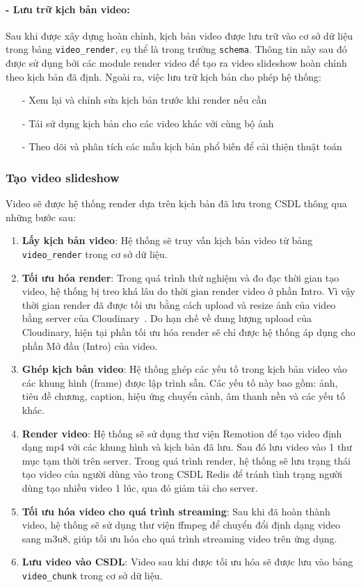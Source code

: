 \paragraph{- Lưu trữ kịch bản video:}
Sau khi được xây dựng hoàn chỉnh, kịch bản video được lưu trữ vào cơ sở dữ liệu trong bảng \texttt{video\_render}, cụ thể là trong trường \texttt{schema}. Thông tin này sau đó được sử dụng bởi các module render video để tạo ra video slideshow hoàn chỉnh theo kịch bản đã định. Ngoài ra, việc lưu trữ kịch bản cho phép hệ thống:
\begin{itemize}
    \item[-] Xem lại và chỉnh sửa kịch bản trước khi render nếu cần
    \item[-] Tái sử dụng kịch bản cho các video khác với cùng bộ ảnh
    \item[-] Theo dõi và phân tích các mẫu kịch bản phổ biến để cải thiện thuật toán
\end{itemize}

\subsubsection{Tạo video slideshow}
Video sẽ được hệ thống render dựa trên kịch bản đã lưu trong CSDL thông qua những bước sau:

\begin{enumerate}
    \item \textbf{Lấy kịch bản video}: Hệ thống sẽ truy vấn kịch bản video từ bảng \texttt{video\_render} trong cơ sở dữ liệu.
    \item \textbf{Tối ưu hóa render}: Trong quá trình thử nghiệm và đo đạc thời gian tạo video, hệ thống bị treo khá lâu do thời gian render video ở phần Intro. Vì vậy thời gian render đã được tối ưu bằng cách upload và resize ảnh của video bằng server của Cloudinary~\cite{cloudinary}. Do hạn chế về dung lượng upload của Cloudinary, hiện tại phần tối ưu hóa render sẽ chỉ được hệ thống áp dụng cho phần Mở đầu (Intro) của video.
    \item \textbf{Ghép kịch bản video}: Hệ thống ghép các yếu tố trong kịch bản video vào các khung hình (frame) được lập trình sẵn. Các yếu tố này bao gồm: ảnh, tiêu đề chương, caption, hiệu ứng chuyển cảnh, âm thanh nền và các yếu tố khác.
    \item \textbf{Render video}: Hệ thống sẽ sử dụng thư viện Remotion để tạo video định dạng mp4 với các khung hình và kịch bản đã lưu. Sau đó lưu video vào 1 thư mục tạm thời trên server. Trong quá trình render, hệ thống sẽ lưu trạng thái tạo video của người dùng vào trong CSDL Redis để tránh tình trạng người dùng tạo nhiều video 1 lúc, qua đó giảm tải cho server.
    \item \textbf{Tối ưu hóa video cho quá trình streaming}: Sau khi đã hoàn thành video, hệ thống sẽ sử dụng thư viện ffmpeg để chuyển đổi định dạng video sang m3u8, giúp tối ưu hóa cho quá trình streaming video trên ứng dụng. 
    \item \textbf{Lưu video vào CSDL}: Video sau khi được tối ưu hóa sẽ được lưu vào bảng \texttt{video\_chunk} trong cơ sở dữ liệu.
\end{enumerate}

